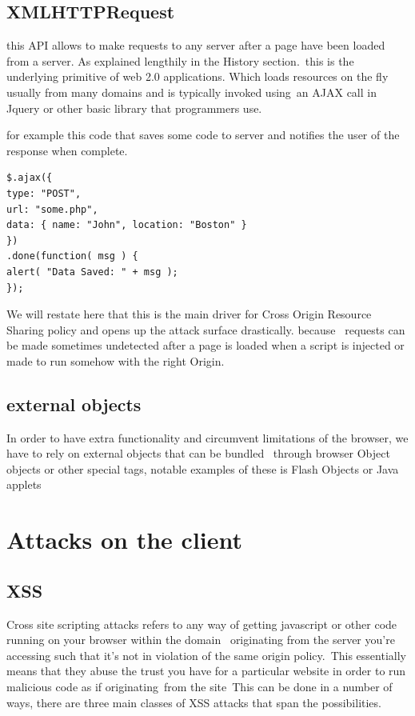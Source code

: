 \subsection{XMLHTTPRequest}

this API allows to make requests to any server after a page have been loaded from a server. As explained lengthily in the History section.\
this is the underlying primitive of web 2.0 applications. Which loads resources on the fly usually from many domains and is typically invoked using\
an AJAX call in Jquery or other basic library that programmers use.

for example this code that saves some code to server  and notifies the user of the response when complete.
\begin{verbatim}
$.ajax({
type: "POST",
url: "some.php",
data: { name: "John", location: "Boston" }
})
.done(function( msg ) {
alert( "Data Saved: " + msg );
});\end{verbatim}

We will restate here that this is the main driver for Cross Origin Resource Sharing policy and opens up the attack surface drastically. because \
requests can be made sometimes undetected after a page is loaded when a script is injected or made to run somehow with the right Origin.\

\subsection{external objects}

In order to have extra functionality and circumvent limitations of the browser, we have to rely on external objects that can be bundled \
through browser Object objects or other special tags, notable examples of these is Flash Objects or Java applets

\section{Attacks on the client}

\subsection{XSS}


Cross site scripting attacks refers to any way of getting javascript or other code running on your browser within the domain \
originating from the server you're accessing such that it's not in violation of the same origin policy.\
This essentially means that they abuse the trust you have for a particular website in order to run malicious code as if originating\
from the site\
This can be done in a number of ways, there are three main classes of XSS attacks that span the possibilities.\\

